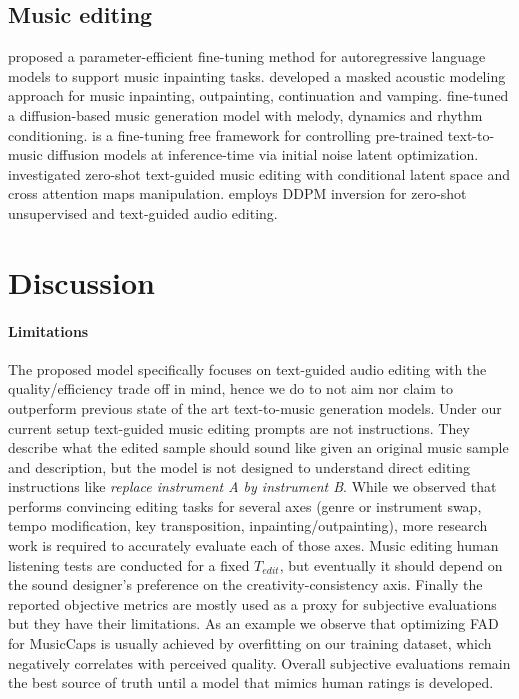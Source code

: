 \subsection{Music editing}

\cite{lin2024arrange} proposed a parameter-efficient fine-tuning method for autoregressive language models to support music inpainting tasks.
\cite{garcia2023vampnet} developed a masked acoustic modeling approach for music inpainting, outpainting, continuation and vamping.
\cite{wu2023music} fine-tuned a diffusion-based music generation model with melody, dynamics and rhythm conditioning.
\cite{novack2024ditto} is a fine-tuning free framework for controlling pre-trained text-to-music diffusion models at inference-time via initial noise latent optimization. 
\cite{zhang2024musicmagus} investigated zero-shot text-guided music editing with conditional latent space and cross attention maps manipulation.
\cite{manor2024zero} employs DDPM inversion \citep{huberman2023edit} for zero-shot unsupervised and text-guided audio editing. 

\section{Discussion}

\paragraph{Limitations}

The proposed model specifically focuses on text-guided audio editing with the quality/efficiency trade off in mind, hence we do to not aim nor claim to outperform previous state of the art text-to-music generation models.
Under our current setup text-guided music editing prompts are not instructions.
They describe what the edited sample should sound like given an original music sample and description, but the model is not designed to understand direct editing instructions like \emph{replace instrument A by instrument B}.
While we observed that \proposed performs convincing editing tasks for several axes (genre or instrument swap, tempo modification, key transposition, inpainting/outpainting), more research work is required to accurately evaluate each of those axes.
Music editing human listening tests are conducted for a fixed $T_{edit}$, but eventually it should depend on the sound designer's preference on the creativity-consistency axis.
Finally the reported objective metrics are mostly used as a proxy for subjective evaluations but they have their limitations.
As an example we observe that optimizing FAD for MusicCaps is usually achieved by overfitting on our training dataset, which negatively correlates with perceived quality.
Overall subjective evaluations remain the best source of truth until a model that mimics human ratings is developed.


